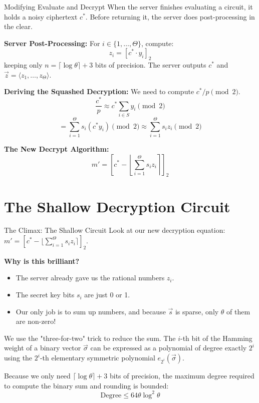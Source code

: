 \documentclass[10pt, aspectratio=169]{beamer}
\begin{document}
\begin{frame}{Modifying Evaluate and Decrypt}
    When the server finishes evaluating a circuit, it holds a noisy ciphertext $c^*$. Before returning it, the server does post-processing in the clear.
    \pause

    \vspace{0.2cm}
    \textbf{Server Post-Processing:}
    For $i \in \{1, \dots, \Theta\}$, compute:
    $$z_i = [c^* \cdot y_i]_2$$
    keeping only $n = \lceil \log \theta \rceil + 3$ bits of precision. The server outputs $c^*$ and $\vec{z} = \langle z_1, \dots, z_\Theta \rangle$.
    \pause

    \vspace{0.2cm}
    \textbf{Deriving the Squashed Decryption:}
    We need to compute $c^*/p \pmod 2$.
    $$\frac{c^*}{p} \approx c^* \sum_{i \in S} y_i \pmod 2$$
    $$= \sum_{i=1}^\Theta s_i (c^* y_i) \pmod 2 \approx \sum_{i=1}^\Theta s_i z_i \pmod 2$$
    \pause
    
    \textbf{The New Decrypt Algorithm:}
    $$m' = \left[ c^* - \left\lfloor \sum_{i=1}^\Theta s_i z_i \right\rceil \right]_2$$
\end{frame}

\section{The Shallow Decryption Circuit}
\begin{frame}{The Climax: The Shallow Circuit}
    Look at our new decryption equation: $m' = \left[ c^* - \lfloor \sum_{i=1}^\Theta s_i z_i \rceil \right]_2$.
    
    \vspace{0.2cm}
    \textbf{Why is this brilliant?}
    \begin{itemize}
        \item The server already gave us the rational numbers $z_i$.
        \item The secret key bits $s_i$ are just 0 or 1.
        \item Our only job is to sum up numbers, and because $\vec{s}$ is sparse, only $\theta$ of them are non-zero!
    \end{itemize}
    \pause

    \vspace{0.2cm}
    \begin{lemma}
    We use the "three-for-two" trick to reduce the sum. The $i$-th bit of the Hamming weight of a binary vector $\vec{\sigma}$ can be expressed as a polynomial of degree exactly $2^i$ using the $2^i$-th elementary symmetric polynomial $e_{2^i}(\vec{\sigma})$.
    \end{lemma}
    \pause

    Because we only need $\lceil \log \theta \rceil + 3$ bits of precision, the maximum degree required to compute the binary sum and rounding is bounded:
    $$\text{Degree} \le 64\theta \log^2\theta$$
\end{frame}
\end{document}
